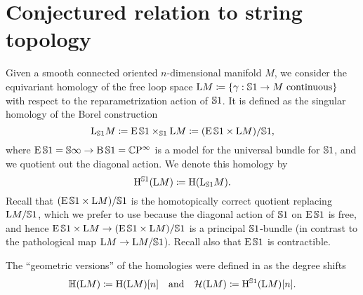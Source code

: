 \documentclass[\MainFolder/Text.tex]{subfiles}
\begin{document}
 
\section{Conjectured relation to string topology}\label{Sec:StringTopology}


Given a smooth connected oriented $n$-dimensional manifold $M$, we consider the equivariant homology of the free loop space $\mathrm{L} M \coloneqq \{\gamma: \mathbb{S}{1} \rightarrow M \text{ continuous}\}$ with respect to the reparametrization action of $\mathbb{S}{1}$. It is defined as the singular homology of the Borel construction  
$$ \mathrm{L}_{\mathbb{S}{1}} M \coloneqq \operatorname{E}\mathbb{S}{1} \times_{\mathbb{S}{1}} \mathrm{L} M \coloneqq (\operatorname{E}\mathbb{S}{1}\times \mathrm{L} M)/\mathbb{S}{1}, $$
where $\operatorname{E}\mathbb{S}{1} = \mathbb{S}{\infty} \rightarrow \operatorname{B} \mathbb{S}{1} = \mathbb{C}\mathrm{P}^\infty$ is a model for the universal bundle for $\mathbb{S}{1}$, and we quotient out the diagonal action. We denote this homology by
$$ \mathrm{H}^{\mathbb{S}{1}}(\mathrm{L} M) \coloneqq \mathrm{H}(\mathrm{L}_{\mathbb{S}{1}} M). $$
Recall that $(\operatorname{E}\mathbb{S}{1}\times \mathrm{L} M)/\mathbb{S}{1}$ is the homotopically correct quotient replacing $\mathrm{L} M/\mathbb{S}{1}$, which we prefer to use because the diagonal action of $\mathbb{S}{1}$ on $\operatorname{E}\mathbb{S}{1}$ is free, and hence $\operatorname{E}\mathbb{S}{1}\times \mathrm{L} M \rightarrow (\operatorname{E}\mathbb{S}{1}\times \mathrm{L} M)/\mathbb{S}{1}$ is a principal $\mathbb{S}{1}$-bundle (in contrast to the pathological map $\mathrm{L} M \rightarrow \mathrm{L} M /\mathbb{S}{1}$). Recall also that $\operatorname{E} \mathbb{S}{1}$ is contractible.


The ``geometric versions'' of the homologies were defined in \cite{Sullivan1999} as the degree shifts
$$ \mathbb{H}(\mathrm{L} M) \coloneqq \mathrm{H}(\mathrm{L} M)[n]\quad\text{and}\quad \mathcal{H}(\mathrm{L} M)\coloneqq \mathrm{H}^{\mathbb{S}{1}}(\mathrm{L} M)[n]. $$
\end{document}
